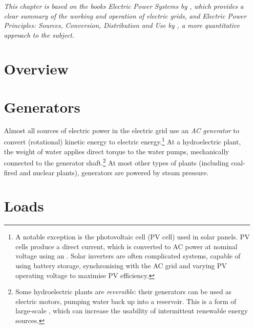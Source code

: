 \documentclass[main.tex]{subfiles}
\begin{document}

\emph{This chapter is based on the books \emph{Electric Power Systems} by \cite{VonMeier2006}, which provides a clear summary of the working and operation of electric grids, and \emph{Electric Power Principles: Sources, Conversion, Distribution and Use} by \cite{Kirtley2010}, a more quantitative approach to the subject.}
\section{Overview}
\section{Generators}
Almost all sources of electric power in the electric grid use an \emph{AC generator} to convert (rotational) kinetic energy to electric energy.\footnote{A notable exception is the photovoltaic cell (PV cell) used in solar panels. PV cells produce a direct current, which is converted to AC power at nominal voltage using an . Solar inverters are often complicated systems, capable of using battery storage, synchronising with the AC grid and varying PV operating voltage to maximise PV efficiency.} 
At a hydroelectric plant, the weight of water applies direct torque to the water pumps, mechanically connected to the generator shaft.\footnote{Some hydroelectric plants are \emph{reversible}: their generators can be used as electric motors, pumping water back up into a reservoir. This is a form of large-scale , which can increase the usability of intermittent renewable energy sources.}
At most other types of plants (including coal-fired and nuclear plants), generators are powered by steam pressure. 
\section{Loads}
\end{document}

